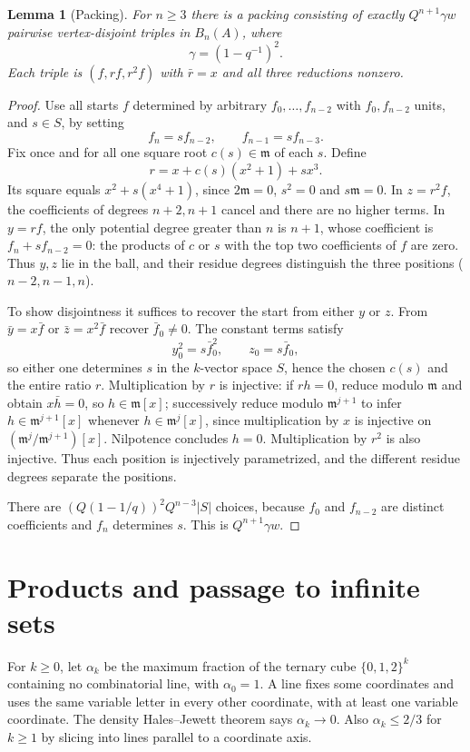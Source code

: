 \documentclass[11pt]{article}
\newtheorem{lemma}[theorem]{Lemma}
\theoremstyle{remark}\newtheorem{remark}[theorem]{Remark}
\newcommand{\m}{\mathfrak m}
\begin{document}
\begin{lemma}[Packing]\label{lem:packing}
For $n\ge3$ there is a packing consisting of exactly $Q^{n+1}\gamma w$ pairwise vertex-disjoint triples in $B_n(A)$, where
\[
 \gamma=(1-q^{-1})^2.
\]
Each triple is $(f,rf,r^2f)$ with $\bar r=x$ and all three reductions nonzero.
\end{lemma}
\begin{proof}
Use all starts $f$ determined by arbitrary $f_0,\ldots,f_{n-2}$ with $f_0,f_{n-2}$ units, and $s\in S$, by setting
\[
 f_n=s f_{n-2},\qquad f_{n-1}=s f_{n-3}.
\]
Fix once and for all one square root $c(s)\in\m$ of each $s$. Define
\begin{equation}\label{eq:ratio}
 r=x+c(s)(x^2+1)+sx^3.
\end{equation}
Its square equals $x^2+s(x^4+1)$, since $2\m=0$, $s^2=0$ and $s\m=0$. In $z=r^2f$, the coefficients of degrees $n+2,n+1$ cancel and there are no higher terms. In $y=rf$, the only potential degree greater than $n$ is $n+1$, whose coefficient is $f_n+sf_{n-2}=0$: the products of $c$ or $s$ with the top two coefficients of $f$ are zero. Thus $y,z$ lie in the ball, and their residue degrees distinguish the three positions ($n-2,n-1,n$).

To show disjointness it suffices to recover the start from either $y$ or $z$. From $\bar y=x\bar f$ or $\bar z=x^2\bar f$ recover $\bar f_0\ne0$. The constant terms satisfy
\[
 y_0^2=s\bar f_0^2,\qquad z_0=s\bar f_0,
\]
so either one determines $s$ in the $k$-vector space $S$, hence the chosen $c(s)$ and the entire ratio $r$. Multiplication by $r$ is injective: if $rh=0$, reduce modulo $\m$ and obtain $x\bar h=0$, so $h\in\m[x]$; successively reduce modulo $\m^{j+1}$ to infer $h\in\m^{j+1}[x]$ whenever $h\in\m^j[x]$, since multiplication by $x$ is injective on $(\m^j/\m^{j+1})[x]$. Nilpotence concludes $h=0$. Multiplication by $r^2$ is also injective. Thus each position is injectively parametrized, and the different residue degrees separate the positions.

There are $(Q(1-1/q))^2 Q^{n-3}|S|$ choices, because $f_0$ and $f_{n-2}$ are distinct coefficients and $f_n$ determines $s$. This is $Q^{n+1}\gamma w$.
\end{proof}

\section{Products and passage to infinite sets}
For $k\ge0$, let $\alpha_k$ be the maximum fraction of the ternary cube $\{0,1,2\}^k$ containing no combinatorial line, with $\alpha_0=1$. A line fixes some coordinates and uses the same variable letter in every other coordinate, with at least one variable coordinate. The density Hales--Jewett theorem \cite{dhj} says $\alpha_k\to0$. Also $\alpha_k\le2/3$ for $k\ge1$ by slicing into lines parallel to a coordinate axis.
\end{document}
